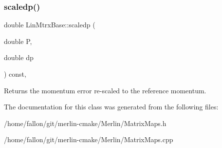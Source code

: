 \subsubsection{\texorpdfstring{scaledp()}{scaledp()}}
{\footnotesize\ttfamily double Lin\+Mtrx\+Base\+::scaledp (\begin{DoxyParamCaption}\item[{double}]{P,  }\item[{double}]{dp }\end{DoxyParamCaption}) const\hspace{0.3cm}{\ttfamily [inline]}, {\ttfamily [protected]}}

Returns the momentum error re-\/scaled to the reference momentum. 

The documentation for this class was generated from the following files\+:\begin{DoxyCompactItemize}
\item 
/home/fallon/git/merlin-\/cmake/\+Merlin/Matrix\+Maps.\+h\item 
/home/fallon/git/merlin-\/cmake/\+Merlin/Matrix\+Maps.\+cpp\end{DoxyCompactItemize}
